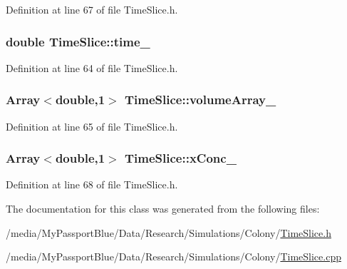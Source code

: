 \-Definition at line 67 of file \-Time\-Slice.\-h.

\hypertarget{class_time_slice_a7fc9adf157f4c97694591625165de7b7}{
\subsubsection[{time\-\_\-}]{\setlength{\rightskip}{0pt plus 5cm}double {\bf \-Time\-Slice\-::time\-\_\-}}}\label{class_time_slice_a7fc9adf157f4c97694591625165de7b7}


\-Definition at line 64 of file \-Time\-Slice.\-h.

\hypertarget{class_time_slice_a32272ea6281a78747200569d5c05cfd4}{
\subsubsection[{volume\-Array\-\_\-}]{\setlength{\rightskip}{0pt plus 5cm}\-Array$<$double,1$>$ {\bf \-Time\-Slice\-::volume\-Array\-\_\-}}}\label{class_time_slice_a32272ea6281a78747200569d5c05cfd4}


\-Definition at line 65 of file \-Time\-Slice.\-h.

\hypertarget{class_time_slice_af4eaf5651a1f181d32d75e0df878a527}{
\subsubsection[{x\-Conc\-\_\-}]{\setlength{\rightskip}{0pt plus 5cm}\-Array$<$double,1$>$ {\bf \-Time\-Slice\-::x\-Conc\-\_\-}}}\label{class_time_slice_af4eaf5651a1f181d32d75e0df878a527}


\-Definition at line 68 of file \-Time\-Slice.\-h.



\-The documentation for this class was generated from the following files\-:\begin{DoxyCompactItemize}
\item 
/media/\-My\-Passport\-Blue/\-Data/\-Research/\-Simulations/\-Colony/\hyperlink{_time_slice_8h}{\-Time\-Slice.\-h}\item 
/media/\-My\-Passport\-Blue/\-Data/\-Research/\-Simulations/\-Colony/\hyperlink{_time_slice_8cpp}{\-Time\-Slice.\-cpp}\end{DoxyCompactItemize}
